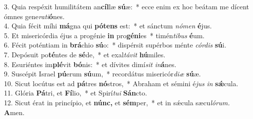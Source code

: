 3. Quia respéxit humilitátem an\textbf{cíl}læ \textbf{sú}æ: * ecce enim ex hoc beátam me dícent ómnes gene\textit{rati}\textbf{ó}nes.\\
4. Quia fécit míhi \textbf{má}gna qui \textbf{pótens} est: * et sánctum \textit{nómen} \textbf{é}jus.\\
5. Et misericórdia éjus a progénie \textbf{in} pro\textbf{géni}es * timén\textit{tibus} \textbf{é}um.\\
6. Fécit poténtiam in \textbf{brá}chio \textbf{sú}o: * dispérsit supérbos ménte \textit{córdis} \textbf{sú}i.\\
7. Depósuit po\textbf{té}ntes de \textbf{sé}de, * et exal\textit{távit} \textbf{hú}miles.\\
8. Esuriéntes im\textbf{plé}vit \textbf{bó}nis: * et dívites dimí\textit{sit} \textit{in}\textbf{á}nes.\\
9. Suscépit Israel \textbf{pú}erum \textbf{sú}um, * recordátus misericór\textit{diæ} \textbf{sú}æ.\\
10. Sicut locútus est ad \textbf{pá}tres \textbf{nó}stros, * Abraham et sémini é\textit{jus} \textit{in} \textbf{sǽ}cula.\\
11. Glória \textbf{Pá}tri, et \textbf{Fí}lio, * et Spirí\textit{tui} \textbf{Sán}cto.\\
12. Sicut érat in princípio, et \textbf{núnc,} et \textbf{sém}per, * et in sǽcula sæcu\textit{lórum.} \textbf{A}men.